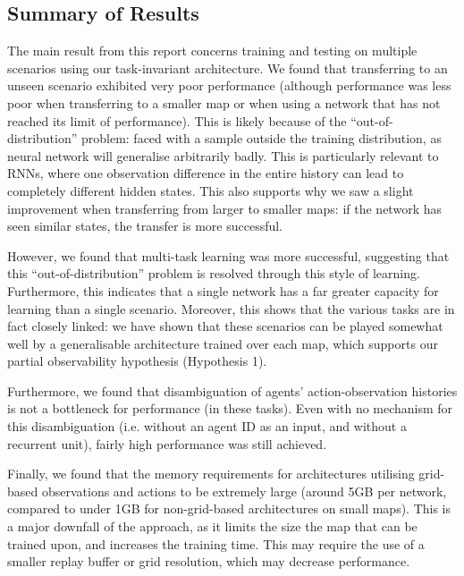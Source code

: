 \subsection{Summary of Results}

The main result from this report concerns training and testing on multiple scenarios using our task-invariant architecture. We found that transferring to an unseen scenario exhibited very poor performance (although performance was less poor when transferring to a smaller map or when using a network that has not reached its limit of performance). This is likely because of the ``out-of-distribution'' \cite{ood} problem: faced with a sample outside the training distribution, as neural network will generalise arbitrarily badly. This is particularly relevant to RNNs, where one observation difference in the entire history can lead to completely different hidden states. This also supports why we saw a slight improvement when transferring from larger to smaller maps: if the network has seen similar states, the transfer is more successful.



However, we found that multi-task learning was more successful, suggesting that this ``out-of-distribution'' problem is resolved through this style of learning. Furthermore, this indicates that a single network has a far greater capacity for learning than a single scenario. Moreover, this shows that the various tasks are in fact closely linked: we have shown that these scenarios can be played somewhat well by a generalisable architecture trained over each map, which supports our partial observability hypothesis (Hypothesis 1).

Furthermore, we found that disambiguation of agents' action-observation histories is not a bottleneck for performance (in these tasks). Even with no mechanism for this disambiguation (i.e. without an agent ID as an input, and without a recurrent unit), fairly high performance was still achieved.

Finally, we found that the memory requirements for architectures utilising grid-based observations and actions to be extremely large (around 5GB per network, compared to under 1GB for non-grid-based architectures on small maps). This is a major downfall of the approach, as it limits the size the map that can be trained upon, and increases the training time. This may require the use of a smaller replay buffer or grid resolution, which may decrease performance.





